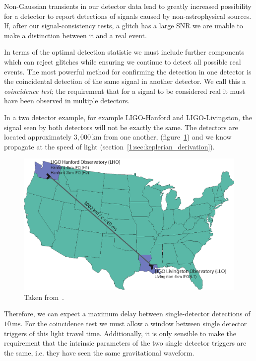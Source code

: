 Non-Gaussian transients in our detector data lead to greatly increased possibility for a \gwadj detector to report detections of \gwadj signals caused by non-astrophysical sources. If, after our signal-consistency tests, a glitch has a large SNR we are unable to make a distinction between it and a real event.

In terms of the optimal detection statistic we must include further components which can reject glitches while ensuring we continue to detect all possible real events. The most powerful method for confirming the detection in one detector is the coincidental detection of the same signal in another detector. We call this a \textit{coincidence test}; the requirement that for a signal to be considered real it must have been observed in multiple detectors.

In a two detector example, for example LIGO-Hanford and LIGO-Livingston, the signal seen by both detectors will not be exactly the same. The detectors are located approximately $3,000 \, \text{km}$ from one another, (figure~\ref{2:fig:observatories}) and we know \gws propagate at the speed of light (section~\ref{1:sec:keplerian_derivation}).
%
\begin{figure}
    \centering
    \includegraphics[width=1.0\linewidth]{images/2_searches/observatories.png}
    \caption{Taken from~\cite{Brown_Thesis:2004}.}
    \label{2:fig:observatories}
\end{figure}
%
Therefore, we can expect a maximum delay between single-detector detections of $10 \, \text{ms}$. For the coincidence test we must allow a window between single detector triggers of this light travel time. Additionally, it is only sensible to make the requirement that the intrinsic parameters of the two single detector triggers are the same, i.e. they have seen the same gravitational waveform.



